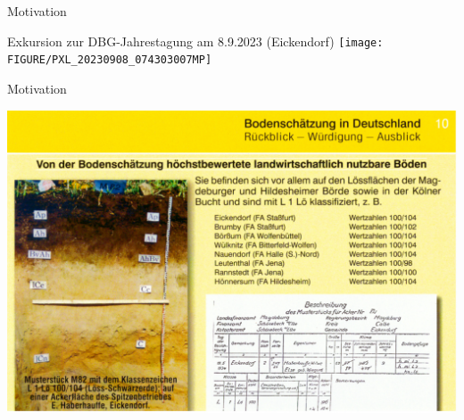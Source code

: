 \begin{frame}{Motivation}
\begin{block}{Exkursion zur DBG-Jahrestagung am 8.9.2023 (Eickendorf)}
\centering\texttt{[image: FIGURE/PXL\_20230908\_074303007MP]}
\end{block}
\end{frame}


\begin{frame}{Motivation}
\begin{block}{}
\centering\includegraphics[width=1\textwidth]{FIGURE/Scan_20230923_154907.jpg}
\end{block}
\end{frame}


